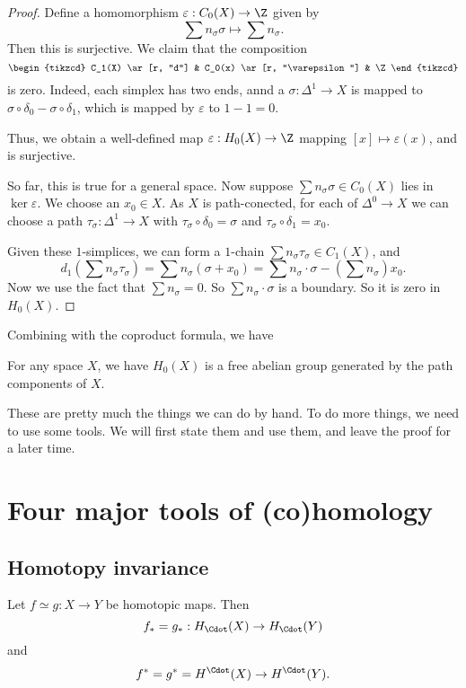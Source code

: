\documentclass[a4paper]{article}
\begin{document}
\begin{proof}
  Define a homomorphism $\varepsilon: C_0(X) \to \Z$ given by
  \[
    \sum n_\sigma \sigma \mapsto \sum n_\sigma.
  \]
  Then this is surjective. We claim that the composition
  \[
    \begin{tikzcd}
      C_1(X) \ar[r, "d"] & C_0(x) \ar[r, "\varepsilon"] & \Z
    \end{tikzcd}
  \]
  is zero. Indeed, each simplex has two ends, annd a $\sigma: \Delta^1 \to X$ is mapped to $\sigma \circ \delta_0 - \sigma \circ \delta_1$, which is mapped by $\varepsilon$ to $1 - 1 = 0$.

  Thus, we obtain a well-defined map $\varepsilon: H_0(X) \to \Z$ mapping $[x] \mapsto \varepsilon(x)$, and is surjective.

  So far, this is true for a general space. Now suppose $\sum n_\sigma \sigma \in C_0(X)$ lies in $\ker \varepsilon$. We choose an $x_0 \in X$. As $X$ is path-conected, for each of $\Delta^0 \to X$ we can choose a path $\tau_\sigma: \Delta^1 \to X$ with $\tau_\sigma \circ \delta_0 = \sigma$ and $\tau_\sigma \circ \delta_1 = x_0$.

  Given these $1$-simplices, we can form a $1$-chain $\sum n_\sigma \tau_\sigma \in C_1(X)$, and
  \[
    d_1\left(\sum n_\sigma \tau_\sigma\right)= \sum n_\sigma(\sigma + x_0) = \sum n_\sigma \cdot \sigma - \left(\sum n_\sigma\right) x_0.
  \]
  Now we use the fact that $\sum n_\sigma = 0$. So $\sum n_\sigma \cdot \sigma$ is a boundary. So it is zero in $H_0(X)$.
\end{proof}

Combining with the coproduct formula, we have
\begin{prop}
  For any space $X$, we have $H_0(X)$ is a free abelian group generated by the path components of $X$.
\end{prop}
These are pretty much the things we can do by hand. To do more things, we need to use some tools. We will first state them and use them, and leave the proof for a later time.

\section{Four major tools of (co)homology}
\subsection{Homotopy invariance}
\begin{thm}
  Let $f \simeq g: X \to Y$ be homotopic maps. Then
  \[
    f_* = g_*: H_{\Cdot}(X) \to H_{\Cdot}(Y)
  \]
  and
  \[
    f^* = g^* = H^{\Cdot}(X) \to H^{\Cdot}(Y).
  \]
\end{thm}
\end{document}
